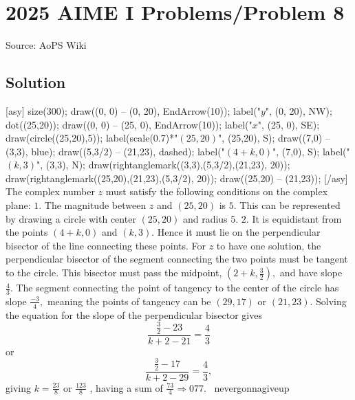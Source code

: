 \documentclass[12pt]{article}
\begin{document}
\section*{{2025 AIME I Problems/Problem 8}}
Source: AoPS Wiki

\subsection*{Solution}
[asy] size(300); draw((0, 0) -- (0, 20), EndArrow(10)); label("$y$", (0, 20), NW); dot((25,20)); draw((0, 0) -- (25, 0), EndArrow(10)); label("$x$", (25, 0), SE); draw(circle((25,20),5)); label(scale(0.7)*"$(25,20)$", (25,20), S); draw((7,0) -- (3,3), blue); draw((5,3/2) -- (21,23), dashed); label("$(4+k,0)$", (7,0), S); label("$(k,3)$", (3,3), N); draw(rightanglemark((3,3),(5,3/2),(21,23), 20)); draw(rightanglemark((25,20),(21,23),(5,3/2), 20)); draw((25,20) -- (21,23)); [/asy] The complex number $z$ must satisfy the following conditions on the complex plane: $1.$ The magnitude between $z$ and $(25,20)$ is $5.$ This can be represented by drawing a circle with center $(25,20)$ and radius $5.$ $2.$ It is equidistant from the points $(4+k,0)$ and $(k,3).$ Hence it must lie on the perpendicular bisector of the line connecting these points. For $z$ to have one solution, the perpendicular bisector of the segment connecting the two points must be tangent to the circle.
This bisector must pass the midpoint, $(2+k,\frac{3}{2}),$ and have slope $\frac{4}{3}.$ The segment connecting the point of tangency to the center of the circle has slope $\frac{-3}{4},$ meaning the points of tangency can be $(29,17)$ or $(21,23).$ Solving the equation for the slope of the perpendicular bisector gives \[\frac{\frac{3}{2}-23}{k+2-21}=\frac{4}{3}\] or \[\frac{\frac{3}{2}-17}{k+2-29}=\frac{4}{3},\] giving $k=\frac{23}{8}$ or $\frac{123}{8}$ , having a sum of $\frac{73}{4} \Longrightarrow \boxed{077}.$ ~nevergonnagiveup
\end{document}
